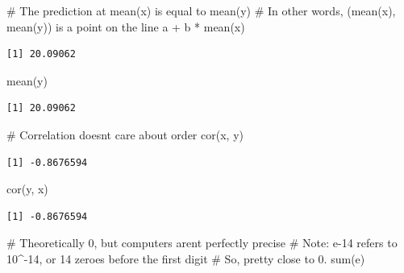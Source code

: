 \documentclass[
  letterpaper,
  DIV=11,
  numbers=noendperiod]{scrreprt}
\newenvironment{Shaded}{\begin{snugshade}}{\end{snugshade}}
\newcommand{\CommentTok}[1]{\textcolor[rgb]{0.37,0.37,0.37}{#1}}
\newcommand{\FunctionTok}[1]{\textcolor[rgb]{0.28,0.35,0.67}{#1}}
\newcommand{\NormalTok}[1]{\textcolor[rgb]{0.00,0.23,0.31}{#1}}
\newcommand{\SpecialCharTok}[1]{\textcolor[rgb]{0.37,0.37,0.37}{#1}}
\begin{document}
\begin{Shaded}
\begin{Highlighting}[]
\CommentTok{\# The prediction at mean(x) is equal to mean(y)}
\CommentTok{\# In other words, (mean(x), mean(y)) is a point on the line}
\NormalTok{a }\SpecialCharTok{+}\NormalTok{ b }\SpecialCharTok{*} \FunctionTok{mean}\NormalTok{(x)}
\end{Highlighting}
\end{Shaded}

\begin{verbatim}
[1] 20.09062
\end{verbatim}

\begin{Shaded}
\begin{Highlighting}[]
\FunctionTok{mean}\NormalTok{(y)}
\end{Highlighting}
\end{Shaded}

\begin{verbatim}
[1] 20.09062
\end{verbatim}

\begin{Shaded}
\begin{Highlighting}[]
\CommentTok{\# Correlation doesn\textquotesingle{}t care about order}
\FunctionTok{cor}\NormalTok{(x, y)}
\end{Highlighting}
\end{Shaded}

\begin{verbatim}
[1] -0.8676594
\end{verbatim}

\begin{Shaded}
\begin{Highlighting}[]
\FunctionTok{cor}\NormalTok{(y, x)}
\end{Highlighting}
\end{Shaded}

\begin{verbatim}
[1] -0.8676594
\end{verbatim}

\begin{Shaded}
\begin{Highlighting}[]
\CommentTok{\# Theoretically 0, but computers aren\textquotesingle{}t perfectly precise}
\CommentTok{\# Note: e{-}14 refers to 10\^{}{-}14, or 14 zeroes before the first digit}
    \CommentTok{\# So, pretty close to 0.}
\FunctionTok{sum}\NormalTok{(e) }
\end{Highlighting}
\end{Shaded}
\end{document}
